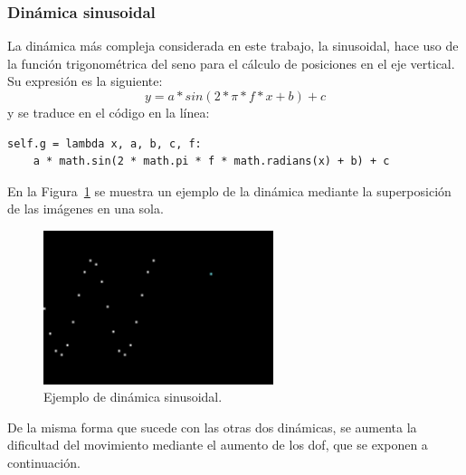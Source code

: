 \subsubsection{Dinámica sinusoidal}
La dinámica más compleja considerada en este trabajo, la sinusoidal, hace uso de la función trigonométrica del seno para el cálculo de posiciones en el eje vertical. Su expresión es la siguiente:
$$y = a*sin(2*\pi*f*x + b) + c$$
y se traduce en el código en la línea:
\vspace{10pt}
\begin{lstlisting}[frame=single]
  self.g = lambda x, a, b, c, f: 
    a * math.sin(2 * math.pi * f * math.radians(x) + b) + c
\end{lstlisting}

En la Figura~\ref{fig.sin} se muestra un ejemplo de la dinámica mediante la superposición de las imágenes en una sola.

\begin{figure}[H]
		\begin{center}
			\includegraphics[width=0.6\textwidth]{Memoria-TFM/figures/samples/sinusoidal_sample.png}
			\caption{Ejemplo de dinámica sinusoidal.}
			\label{fig.sin}
		\end{center}
\end{figure}

De la misma forma que sucede con las otras dos dinámicas, se aumenta la dificultad del movimiento mediante el aumento  de los \acrshort{dof}, que se exponen a continuación.\\

